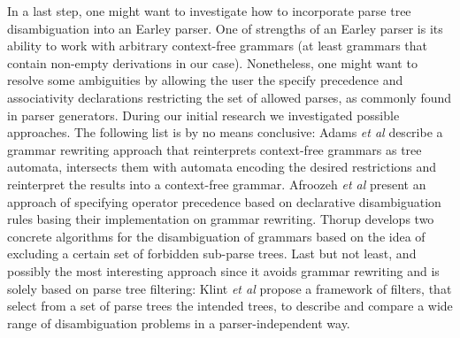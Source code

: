 \begin{isabellebody}
\begin{isamarkuptext}
In a last step, one might want to investigate how to incorporate parse tree disambiguation into an
Earley parser. One of strengths of an Earley parser is its ability to work with arbitrary context-free
grammars (at least grammars that contain non-empty derivations in our case). Nonetheless, one might
want to resolve some ambiguities by allowing the user the specify precedence and associativity declarations
restricting the set of allowed parses, as commonly found in parser generators. During our initial
research we investigated possible approaches. The following list is by no means conclusive:
Adams \textit{et al} \cite{Adams:2017} describe a grammar rewriting approach that reinterprets context-free
grammars as tree automata, intersects them with automata encoding the desired restrictions and reinterpret
the results into a context-free grammar. Afroozeh \textit{et al} \cite{Afroozeh:2013} present an approach
of specifying operator precedence based on declarative disambiguation rules basing their implementation
on grammar rewriting. Thorup \cite{Thorup:1996} develops two concrete algorithms for the disambiguation of
grammars based on the idea of excluding a certain set of forbidden sub-parse trees. Last but not least,
and possibly the most interesting approach since it avoids grammar rewriting and is solely based on parse
tree filtering: Klint \textit{et al} \cite{Klint:1997} propose a framework of filters, that select from
a set of parse trees the intended trees, to describe and compare a wide range of disambiguation problems
in a parser-independent way.%
\end{isamarkuptext}\isamarkuptrue%
%
\isadelimtheory
%
\endisadelimtheory
%
\isatagtheory
%
\endisatagtheory
{\isafoldtheory}%
%
\isadelimtheory
%
\endisadelimtheory
%
\end{isabellebody}%
\endinput
